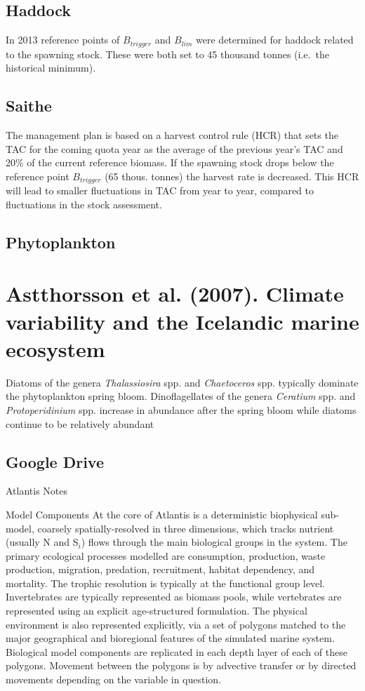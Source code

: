 \documentclass{report}
\begin{document}
\subsection{Haddock}
In 2013 reference points of $B_{trigger}$ and $B_{lim}$ were determined for haddock related to the spawning stock. These were both set to 45 thousand tonnes (i.e.\ the historical minimum).

\subsection{Saithe}

The management plan is based on a harvest control rule (HCR) that sets the TAC for the coming quota year as the average of the previous year’s TAC and 20\% of the current reference biomass. If the spawning stock drops below the reference point $B_{trigger}$ (65 thous. tonnes) the harvest rate is decreased. This HCR will lead to smaller fluctuations in TAC from year to year, compared to fluctuations in the stock assessment.

\subsection{Phytoplankton}


\section{Astthorsson et al. (2007). Climate variability and the Icelandic marine ecosystem}
Diatoms of the genera \textit{Thalassiosira} spp. and \textit{Chaetoceros} spp. typically dominate the phytoplankton spring bloom. Dinoflagellates of the genera \textit{Ceratium} spp. and \textit{Protoperidinium} spp. increase in abundance after the spring bloom while diatoms continue to be relatively abundant

\subsection{Google Drive}

              
Atlantis Notes

Model Components
At the core of Atlantis is a deterministic biophysical sub-model, coarsely spatially-resolved in three dimensions, which tracks nutrient (usually N and S$_i$) flows through the main biological groups in the system. The primary ecological processes modelled are consumption, production, waste production, migration, predation, recruitment, habitat dependency, and mortality. The trophic resolution is typically at the functional group level. Invertebrates are typically represented as biomass pools, while vertebrates are represented using an explicit age-structured formulation. The physical environment is also represented explicitly, via a set of polygons matched to the major geographical and bioregional features of the simulated marine system. Biological model components are replicated in each depth layer of each of these polygons. Movement between the polygons is by advective transfer or by directed movements depending on the variable in question.
\end{document}
